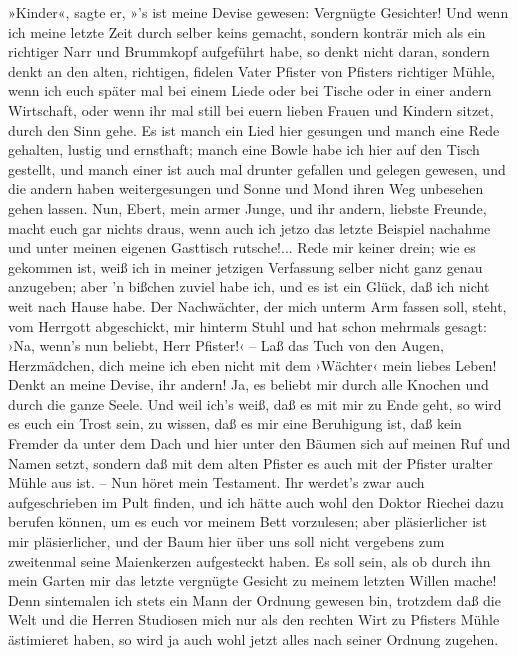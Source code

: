 »Kinder«, sagte er, »'s ist meine Devise gewesen: Vergnügte
Gesichter! Und wenn ich meine letzte Zeit durch selber keins
gemacht, sondern konträr mich als ein richtiger Narr und Brummkopf
aufgeführt habe, so denkt nicht daran, sondern denkt an den alten,
richtigen, fidelen Vater Pfister von Pfisters richtiger Mühle, wenn
ich euch später mal bei einem Liede oder bei Tische oder in einer
andern Wirtschaft, oder wenn ihr mal still bei euern lieben Frauen
und Kindern sitzet, durch den Sinn gehe. Es ist manch ein Lied hier
gesungen und manch eine Rede gehalten, lustig und ernsthaft; manch
eine Bowle habe ich hier auf den Tisch gestellt, und manch einer
ist auch mal drunter gefallen und gelegen gewesen, und die andern
haben weitergesungen und Sonne und Mond ihren Weg unbesehen gehen
lassen. Nun, Ebert, mein armer Junge, und ihr andern, liebste
Freunde, macht euch gar nichts draus, wenn auch ich jetzo das
letzte Beispiel nachahme und unter meinen eigenen Gasttisch
rutsche!... Rede mir keiner drein; wie es gekommen ist, weiß ich in
meiner jetzigen Verfassung selber nicht ganz genau anzugeben; aber
'n bißchen zuviel habe ich, und es ist ein Glück, daß ich nicht
weit nach Hause habe. Der Nachwächter, der mich unterm Arm fassen
soll, steht, vom Herrgott abgeschickt, mir hinterm Stuhl und hat
schon mehrmals gesagt: ›Na, wenn's nun beliebt, Herr Pfister!‹ –
Laß das Tuch von den Augen, Herzmädchen, dich meine ich eben nicht
mit dem ›Wächter‹ mein liebes Leben! Denkt an meine Devise, ihr
andern! Ja, es beliebt mir durch alle Knochen und durch die ganze
Seele. Und weil ich's weiß, daß es mit mir zu Ende geht, so wird es
euch ein Trost sein, zu wissen, daß es mir eine Beruhigung ist, daß
kein Fremder da unter dem Dach und hier unter den Bäumen sich auf
meinen Ruf und Namen setzt, sondern daß mit dem alten Pfister es
auch mit der Pfister uralter Mühle aus ist. – Nun höret mein
Testament. Ihr werdet's zwar auch aufgeschrieben im Pult finden,
und ich hätte auch wohl den Doktor Riechei dazu berufen können, um
es euch vor meinem Bett vorzulesen; aber pläsierlicher ist mir
pläsierlicher, und der Baum hier über uns soll nicht vergebens zum
zweitenmal seine Maienkerzen aufgesteckt haben. Es soll sein, als
ob durch ihn mein Garten mir das letzte vergnügte Gesicht zu meinem
letzten Willen mache! Denn sintemalen ich stets ein Mann der
Ordnung gewesen bin, trotzdem daß die Welt und die Herren Studiosen
mich nur als den rechten Wirt zu Pfisters Mühle ästimieret haben,
so wird ja auch wohl jetzt alles nach seiner Ordnung zugehen.

